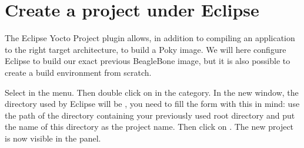 \section{Create a project under Eclipse}

The Eclipse Yocto Project plugin allows, in addition to compiling an application
to the right target architecture, to build a Poky image. We will here configure
Eclipse to build our exact previous BeagleBone image, but it is also possible to
create a build environment from scratch.

Select  in the  menu. Then double click on  in the  category. In the new
window, the directory used by Eclipse will be , you need to fill the form with this in mind: use the path of the
directory containing your previously used  root directory and put
the name of this directory as the project name. Then click on .
The new project is now visible in the  panel.



